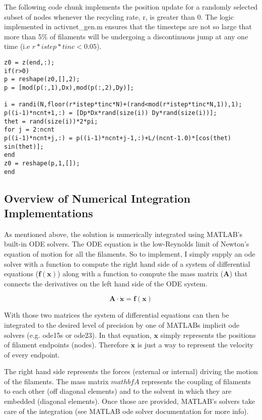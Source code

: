 The following code chunk implements the position update for a randomly selected subset of nodes whenever the recycling rate, r, is greater than 0.  The logic implemented in activnet\_gen.m ensures that the timesteps are not so large that more than 5\% of filaments will be undergoing a discontinuous jump at any one time (i.e $r*istep*tinc <0.05$).

\begin{verbatim}
z0 = z(end,:);
if(r>0)
p = reshape(z0,[],2);
p = [mod(p(:,1),Dx),mod(p(:,2),Dy)];

i = randi(N,floor(r*istep*tinc*N)+(rand<mod(r*istep*tinc*N,1)),1);
p((i-1)*ncnt+1,:) = [Dp*Dx*rand(size(i)) Dy*rand(size(i))];
thet = rand(size(i))*2*pi;
for j = 2:ncnt
p((i-1)*ncnt+j,:) = p((i-1)*ncnt+j-1,:)+L/(ncnt-1.0)*[cos(thet) sin(thet)];
end
z0 = reshape(p,1,[]);
end
\end{verbatim}


\subsection{Overview of Numerical Integration Implementations}
As mentioned above, the solution is numerically integrated using MATLAB's built-in ODE solvers.  The ODE equation is the low-Reynolds limit of Newton's equation of motion for all the filaments.  So to implement, I simply supply an ode solver with a function to compute the right hand side of a system of differential equations ($\mathbf{f(x)}$) along with a function to compute the mass matrix ($\mathbf{A}$) that connects the derivatives on the left hand side of the ODE system.

\begin{equation}
\mathbf{A \cdot \dot x} = \mathbf{f(x)}
\end{equation}

With those two matrices the system of differential equations can then be integrated to the desired level of precision by one of MATLABs implicit ode solvers (e.g. ode15s or ode23).  In that equation, $\mathbf{x}$ simply represents the positions of filament endpoints (nodes).  Therefore $\mathbf{\dot{x}}$ is just a way to represent the velocity of every endpoint.  

The right hand side represents the forces (external or internal) driving the motion of the filaments.  The mass matrix $mathbf{A}$ represents the coupling of filaments to each other (off diagonal elements) and to the solvent in which they are embedded (diagonal elements).  Once those are provided, MATLAB's solvers take care of the integration (see MATLAB ode solver documentation for more info).


